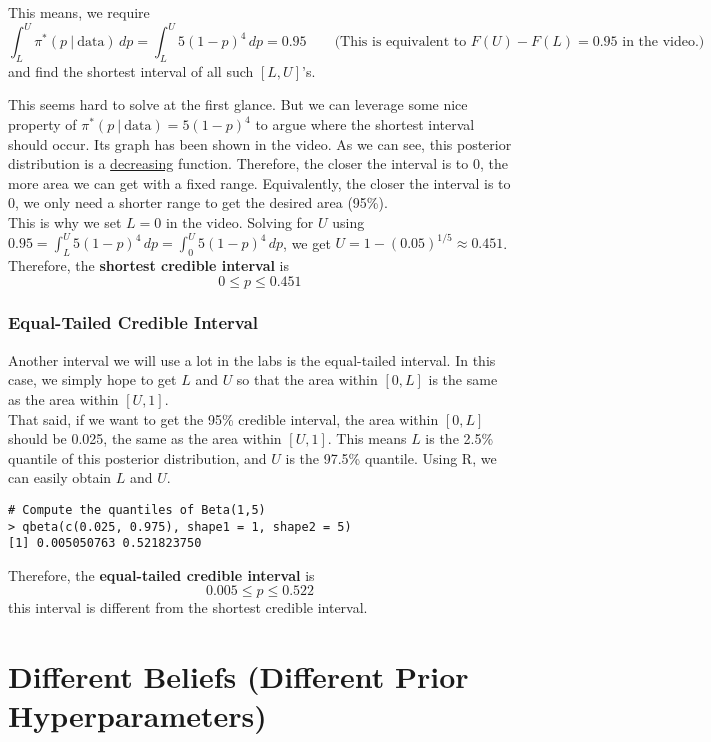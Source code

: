 \documentclass{article}
\def\dsst{\displaystyle}
\begin{document}
This means, we require
$$ \int_L^U \pi^*(p~|~\text{data})\, dp = \int_L^U 5(1-p)^4\, dp = 0.95\qquad \text{(This is equivalent to $F(U)-F(L) = 0.95$ in the video.)} $$
and find the shortest interval of all such $[L, U]$'s. 

This seems hard to solve at the first glance. But we can leverage some nice property of $\pi^*(p~|~\text{data}) = 5(1-p)^4$ to argue where the shortest interval should occur. Its graph has been shown in the video. As we can see, this posterior distribution is a \underline{decreasing} function. Therefore, the closer the interval is to 0, the more area we can get with a fixed range. Equivalently, the closer the interval is to 0, we only need a shorter range to get the desired area (95\%).\\

This is why we set $L=0$ in the video. Solving for $U$ using $\dsst 0.95 = \int_L^U 5(1-p)^4\, dp=\int_0^U 5(1-p)^4\, dp$, we get $U = 1-(0.05)^{1/5}\approx 0.451$. Therefore, the \textbf{shortest credible interval} is
$$ 0\leq p\leq 0.451 $$

\subsubsection*{Equal-Tailed Credible Interval}

Another interval we will use a lot in the labs is the equal-tailed interval. In this case, we simply hope to get $L$ and $U$ so that the area within $[0, L]$ is the same as the area within $[U, 1]$. \\

That said, if we want to get the 95\% credible interval, the area within $[0,L]$ should be 0.025, the same as the area within $[U, 1]$. This means $L$ is the 2.5\% quantile of this posterior distribution, and $U$ is the 97.5\% quantile. Using R, we can easily obtain $L$ and $U$.
\begin{lstlisting}
# Compute the quantiles of Beta(1,5)
> qbeta(c(0.025, 0.975), shape1 = 1, shape2 = 5)
[1] 0.005050763 0.521823750
\end{lstlisting}

Therefore, the \textbf{equal-tailed credible interval} is
$$ 0.005 \leq p \leq 0.522 $$
this interval is different from the shortest credible interval.


\section{Different Beliefs (Different Prior Hyperparameters)}
\end{document}
